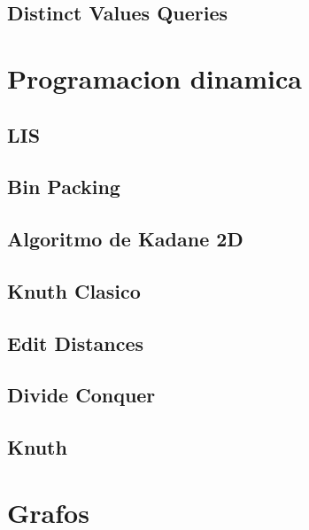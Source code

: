 \subsection{Distinct Values Queries}
\raggedbottom
\hrulefill

\section{Programacion dinamica}
\subsection{LIS}
\raggedbottom
\hrulefill
\subsection{Bin Packing}
\raggedbottom
\hrulefill
\subsection{Algoritmo de Kadane 2D}
\raggedbottom
\hrulefill
\subsection{Knuth Clasico}
\raggedbottom
\hrulefill
\subsection{Edit Distances}
\raggedbottom
\hrulefill
\subsection{Divide Conquer}
\raggedbottom
\hrulefill
\subsection{Knuth}
\raggedbottom
\hrulefill

\section{Grafos}
